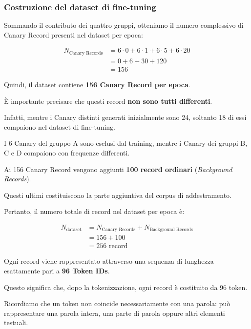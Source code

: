 \subsubsection{Costruzione del dataset di fine-tuning}

Sommando il contributo dei quattro gruppi,
otteniamo il numero complessivo di
Canary Record presenti nel dataset per epoca:

\begin{equation}
\begin{aligned}
N_{\text{Canary Records}}
&= 6 \cdot 0 + 6 \cdot 1
   + 6 \cdot 5 + 6 \cdot 20 \\
&= 0 + 6 + 30 + 120 \\
&= \boxed{156}
\end{aligned}
\end{equation}

Quindi, il dataset contiene
\textbf{156 Canary Record per epoca}.

È importante precisare che questi record
\textbf{non sono tutti differenti}.

Infatti, mentre i Canary distinti generati
inizialmente sono 24, soltanto 18 di essi
compaiono nel dataset di fine-tuning.

I 6 Canary del gruppo A sono esclusi
dal training, mentre i Canary dei gruppi
B, C e D compaiono con frequenze differenti.

Ai 156 Canary Record vengono aggiunti
\textbf{100 record ordinari}
(\textit{Background Records}).

Questi ultimi costituiscono la parte
aggiuntiva del corpus di addestramento.

Pertanto, il numero totale di record
nel dataset per epoca è:

\begin{equation}
\begin{aligned}
N_{\text{dataset}}
&= N_{\text{Canary Records}}
   + N_{\text{Background Records}} \\
&= 156 + 100 \\
&= \boxed{256 \text{ record}}
\end{aligned}
\end{equation}

Ogni record viene rappresentato attraverso
una sequenza di lunghezza esattamente pari a
\textbf{96 Token IDs}.

Questo significa che, dopo la tokenizzazione,
ogni record è costituito da 96 token.

Ricordiamo che un token non coincide
necessariamente con una parola: può
rappresentare una parola intera, una parte
di parola oppure altri elementi testuali.


